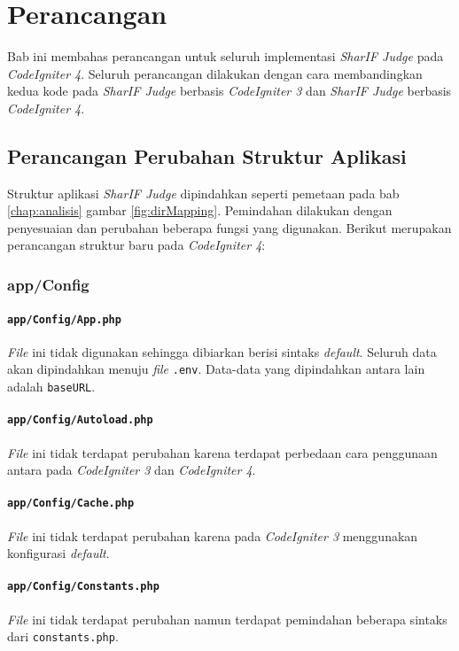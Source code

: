 \chapter{Perancangan}
\label{chap:perancangan}
Bab ini membahas perancangan untuk seluruh implementasi \textit{SharIF Judge} pada \textit{CodeIgniter 4}. Seluruh perancangan dilakukan dengan cara membandingkan kedua kode pada \textit{SharIF Judge} berbasis \textit{CodeIgniter 3} dan \textit{SharIF Judge} berbasis \textit{CodeIgniter 4}.

\section{Perancangan Perubahan Struktur Aplikasi}
Struktur aplikasi \textit{SharIF Judge} dipindahkan seperti pemetaan pada bab \ref{chap:analisis} gambar \ref{fig:dirMapping}. Pemindahan dilakukan dengan penyesuaian dan perubahan beberapa fungsi yang digunakan. Berikut merupakan perancangan struktur baru pada \textit{CodeIgniter 4}:
\subsection{app/Config}
\subsubsection{\texttt{app/Config/App.php}}
\textit{File} ini tidak digunakan sehingga dibiarkan berisi sintaks \textit{default}. Seluruh data akan dipindahkan menuju \textit{file} \texttt{.env}. Data-data yang dipindahkan antara lain adalah \texttt{baseURL}.
\subsubsection{\texttt{app/Config/Autoload.php}}
\textit{File} ini tidak terdapat perubahan karena terdapat perbedaan cara penggunaan antara pada \textit{CodeIgniter 3} dan \textit{CodeIgniter 4}.
\subsubsection{\texttt{app/Config/Cache.php}}
\textit{File} ini tidak terdapat perubahan karena pada \textit{CodeIgniter 3} menggunakan konfigurasi \textit{default}.
\subsubsection{\texttt{app/Config/Constants.php}}
\textit{File} ini tidak terdapat perubahan namun terdapat pemindahan beberapa sintaks dari \texttt{constants.php}.
